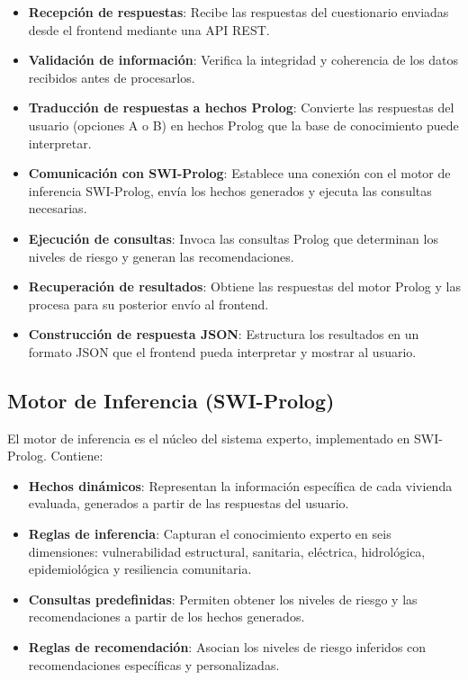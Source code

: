 \documentclass[12pt, letterpaper]{article}
\begin{document}
\begin{itemize}
  \item \textbf{Recepción de respuestas}: Recibe las respuestas del cuestionario enviadas desde el frontend mediante una API REST.
  \item \textbf{Validación de información}: Verifica la integridad y coherencia de los datos recibidos antes de procesarlos.
  \item \textbf{Traducción de respuestas a hechos Prolog}: Convierte las respuestas del usuario (opciones A o B) en hechos Prolog que la base de conocimiento puede interpretar.
  \item \textbf{Comunicación con SWI-Prolog}: Establece una conexión con el motor de inferencia SWI-Prolog, envía los hechos generados y ejecuta las consultas necesarias.
  \item \textbf{Ejecución de consultas}: Invoca las consultas Prolog que determinan los niveles de riesgo y generan las recomendaciones.
  \item \textbf{Recuperación de resultados}: Obtiene las respuestas del motor Prolog y las procesa para su posterior envío al frontend.
  \item \textbf{Construcción de respuesta JSON}: Estructura los resultados en un formato JSON que el frontend pueda interpretar y mostrar al usuario.
\end{itemize}

\subsection{Motor de Inferencia (SWI-Prolog)}

El motor de inferencia es el núcleo del sistema experto, implementado en SWI-Prolog. Contiene:

\begin{itemize}
  \item \textbf{Hechos dinámicos}: Representan la información específica de cada vivienda evaluada, generados a partir de las respuestas del usuario.
  \item \textbf{Reglas de inferencia}: Capturan el conocimiento experto en seis dimensiones: vulnerabilidad estructural, sanitaria, eléctrica, hidrológica, epidemiológica y resiliencia comunitaria.
  \item \textbf{Consultas predefinidas}: Permiten obtener los niveles de riesgo y las recomendaciones a partir de los hechos generados.
  \item \textbf{Reglas de recomendación}: Asocian los niveles de riesgo inferidos con recomendaciones específicas y personalizadas.
\end{itemize}
\end{document}

